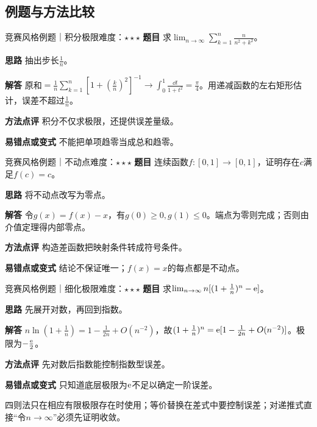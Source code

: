\subsection{例题与方法比较}
\begin{example}{竞赛风格例题｜积分极限}{难度：$\star\star\star$}
\label{ex:1:13}\textbf{题目} 求$\lim_{n\to\infty}\sum_{k=1}^n \frac{n}{n^2+k^2}$。\par
\textbf{思路} 抽出步长$\frac{1}{n}$。\par
\textbf{解答} 原和$=\frac1n\sum_{k=1}^n[1+(\frac{k}{n})^2]^{-1}\to\int_0^1\frac{\dd t}{1+t^2}=\frac{\pi}{4}$。用递减函数的左右矩形估计，误差不超过$\frac{1}{n}$。\par
\textbf{方法点评} 积分不仅求极限，还提供误差量级。\par
\textbf{易错点或变式} 不能把单项趋零当成总和趋零。
\end{example}
\begin{example}{竞赛风格例题｜不动点}{难度：$\star\star\star$}
\label{ex:1:14}\textbf{题目} 连续函数$f:[0,1]\to[0,1]$，证明存在$c$满足$f(c)=c$。\par
\textbf{思路} 将不动点改写为零点。\par
\textbf{解答} 令$g(x)=f(x)-x$，有$g(0)\ge0,g(1)\le0$。端点为零则完成；否则由介值定理得内部零点。\par
\textbf{方法点评} 构造差函数把映射条件转成符号条件。\par
\textbf{易错点或变式} 结论不保证唯一；$f(x)=x$的每点都是不动点。
\end{example}
\begin{example}{竞赛风格例题｜细化极限}{难度：$\star\star\star$}
\label{ex:1:15}\textbf{题目} 求$\lim_{n\to\infty}n[(1+\frac{1}{n})^n-\mathrm{e}]$。\par
\textbf{思路} 先展开对数，再回到指数。\par
\textbf{解答} $n\ln(1+\frac{1}{n})=1-\frac{1}{2n}+O(n^{-2})$，故$(1+\frac{1}{n})^n=\mathrm{e}[1-\frac{1}{2n}+O(n^{-2})]$。极限为$-\frac{\mathrm{e}}{2}$。\par
\textbf{方法点评} 先对数后指数能控制指数型误差。\par
\textbf{易错点或变式} 只知道底层极限为$\mathrm{e}$不足以确定一阶误差。
\end{example}
\begin{warning}四则法只在相应有限极限存在时使用；等价替换在差式中要控制误差；对递推式直接“令$n\to\infty$”必须先证明收敛。\end{warning}







